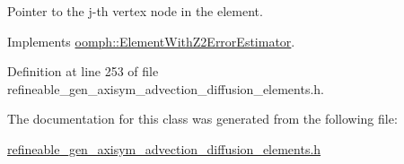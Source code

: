 Pointer to the j-\/th vertex node in the element. 



Implements \hyperlink{classoomph_1_1ElementWithZ2ErrorEstimator_a0eedccc33519f852c5dc2055ddf2774b}{oomph\+::\+Element\+With\+Z2\+Error\+Estimator}.



Definition at line 253 of file refineable\+\_\+gen\+\_\+axisym\+\_\+advection\+\_\+diffusion\+\_\+elements.\+h.



The documentation for this class was generated from the following file\+:\begin{DoxyCompactItemize}
\item 
\hyperlink{refineable__gen__axisym__advection__diffusion__elements_8h}{refineable\+\_\+gen\+\_\+axisym\+\_\+advection\+\_\+diffusion\+\_\+elements.\+h}\end{DoxyCompactItemize}
